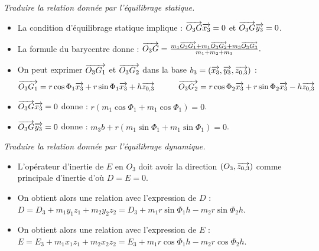 \begin{exemple}
 \textit{Traduire la relation donnée par l'équilibrage statique.}
\begin{itemize}
\item La condition d'équilibrage statique implique : $\overrightarrow{O_3G} \overrightarrow{x_3}=0$ et $\overrightarrow{O_3G} \overrightarrow{y_3}=0$.
\item La formule du barycentre donne : 
$
\overrightarrow{O_3G}=\frac{m_1 \overrightarrow{O_3G_1}+m_1 \overrightarrow{O_3G_2}+m_3 \overrightarrow{O_3G_3}}{m_1+m_2+m_3}.
$
\item On peut exprimer $\overrightarrow{O_3G_1}$ et $\overrightarrow{O_3G_2}$ dans la base $b_3=\left(\overrightarrow{{x_3}},\overrightarrow{{y}_3},\overrightarrow{{z}_{0,3}} \right)$ :
$$
\overrightarrow{O_3G_1}=r \cos\Phi_1 \overrightarrow{x_3}+r \sin\Phi_1 \overrightarrow{x_3}+h \overrightarrow{z_{0,3}}
\quad\quad\quad
\overrightarrow{O_3G_2}=r \cos\Phi_2 \overrightarrow{x_3}+r \sin\Phi_2 \overrightarrow{x_3}-h \overrightarrow{z_{0,3}}
$$

\item $\overrightarrow{O_3G} \overrightarrow{x_3}=0$ donne : 
$
r \left(m_1 \cos\Phi_1+m_1 \cos\Phi_1 \right)=0$.
\item $\overrightarrow{O_3G} \overrightarrow{y_3}=0$ donne : 
$
m_3 b+r \left(m_1 \sin\Phi_1+m_1 \sin\Phi_1 \right)=0
$.
\end{itemize}


\textit{Traduire la relation donnée par l'équilibrage dynamique.}

\begin{itemize}
\item L'opérateur d'inertie de $E$ en $O_3$ doit avoir la direction $\left(O_3,\overrightarrow{{z_{0,3}}}\right)$  comme principale d'inertie d'où $D=E=0$.
\item On obtient alors une relation avec l'expression de $D$ : 
$
D=D_3+m_1 y_1 z_1+ m_2 y_2 z_2=D_3+m_1 r \sin\Phi_1 h-m_2 r \sin\Phi_2 h
$.
\item On obtient alors une relation avec l'expression de $E$ :
$E=E_3+m_1 x_1 z_1+m_2 x_2 z_2=E_3+m_1 r \cos\Phi_1 h-m_2 r \cos\Phi_2 h
$.
\end{itemize}

\end{exemple}

